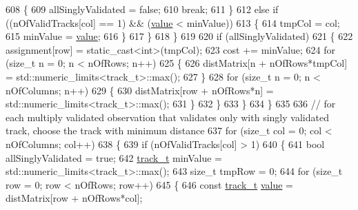 \begin{DoxyCode}
608                         \{
609                             allSinglyValidated = \textcolor{keyword}{false};
610                             \textcolor{keywordflow}{break};
611                         \}
612                         \textcolor{keywordflow}{else} \textcolor{keywordflow}{if} ((nOfValidTracks[col] == 1) && (\mbox{\hyperlink{struct_g_m_l__token_a50b20988e3fe419332313e8d9e02c775}{value}} < minValue))
613                         \{
614                             tmpCol = col;
615                             minValue = \mbox{\hyperlink{struct_g_m_l__token_a50b20988e3fe419332313e8d9e02c775}{value}};
616                         \}
617                     \}
618                 \}
619 
620                 \textcolor{keywordflow}{if} (allSinglyValidated)
621                 \{
622                     assignment[row] = \textcolor{keyword}{static\_cast<}\textcolor{keywordtype}{int}\textcolor{keyword}{>}(tmpCol);
623                     cost += minValue;
624                     \textcolor{keywordflow}{for} (\textcolor{keywordtype}{size\_t} n = 0; n < nOfRows; n++)
625                     \{
626                         distMatrix[n + nOfRows*tmpCol] = std::numeric\_limits<track\_t>::max();
627                     \}
628                     \textcolor{keywordflow}{for} (\textcolor{keywordtype}{size\_t} n = 0; n < nOfColumns; n++)
629                     \{
630                         distMatrix[row + nOfRows*n] = std::numeric\_limits<track\_t>::max();
631                     \}
632                 \}
633             \}
634         \}
635 
636         \textcolor{comment}{// for each multiply validated observation that validates only with singly validated  track, choose
       the track with minimum distance}
637         \textcolor{keywordflow}{for} (\textcolor{keywordtype}{size\_t} col = 0; col < nOfColumns; col++)
638         \{
639             \textcolor{keywordflow}{if} (nOfValidTracks[col] > 1)
640             \{
641                 \textcolor{keywordtype}{bool} allSinglyValidated = \textcolor{keyword}{true};
642                 \mbox{\hyperlink{defines_8h_a7ce9c8817b42ab418e61756f579549ab}{track\_t}} minValue = std::numeric\_limits<track\_t>::max();
643                 \textcolor{keywordtype}{size\_t} tmpRow = 0;
644                 \textcolor{keywordflow}{for} (\textcolor{keywordtype}{size\_t} row = 0; row < nOfRows; row++)
645                 \{
646                     \textcolor{keyword}{const} \mbox{\hyperlink{defines_8h_a7ce9c8817b42ab418e61756f579549ab}{track\_t}} \mbox{\hyperlink{struct_g_m_l__token_a50b20988e3fe419332313e8d9e02c775}{value}} = distMatrix[row + nOfRows*col];

\end{DoxyCode}
